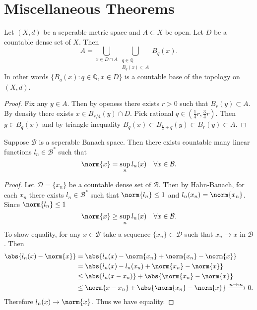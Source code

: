 \documentclass[fontsize=12pt, DIV=10]{scrreprt}
\theoremstyle{remark}
\newcommand{\Q}{\mathbb Q}
\newcommand{\calB}{\mathcal B}
\newcommand{\calD}{\mathcal D}
\begin{document}
\appendix

\chapter{Miscellaneous Theorems}

\begin{prop}
	Let $(X, d)$ be a seperable metric space and $A \subset X$ be open. Let $D$ be a countable dense set of $X$. Then
	\begin{equation}
		A = \bigcup_{x \in D \cap A} \bigcup_{\substack{q \in \Q \\ B_q(x) \subset A}} B_q(x).
	\end{equation}
	In other words $\{B_q(x) : q \in \Q, x \in D\}$ is a countable base of the topology on $(X, d)$.
\end{prop}

\begin{proof}
	Fix any $y \in A$. Then by openess there exists $r > 0$ such that $B_r(y) \subset A$. By density there exists $x \in B_{r/4}(y) \cap D$. Pick rational $q \in \left(\frac{1}{4}r, \frac{3}{4}r \right)$. Then $y \in B_q(x)$ and by triangle inequality $B_q(x) \subset B_{\frac{r}{4} + q}(y) \subset B_r(y) \subset A$.
\end{proof}

\begin{prop}
	Suppose $\calB$ is a seperable Banach space. Then there exists countable many linear functions $l_n \in \calB^*$ such that
	\begin{equation}
		\norm{x} = \sup_n l_n(x) \quad \forall x \in \calB.
	\end{equation}
\end{prop}
\begin{proof}
	Let $\calD = \{x_n\}$ be a countable dense set of $\calB$. Then by Hahn-Banach, for each $x_n$ there exists $l_n \in \calB^*$ such that $\norm{l_n} \leq 1$ and $l_n(x_n) = \norm{x_n}$. Since $\norm{l_n} \leq 1$
	\begin{equation}
		\norm{x} \geq \sup_n l_n(x) \quad \forall x \in \calB.
	\end{equation}
	To show equality, for any $x \in \calB$ take a sequence $\{x_n\} \subset \calD$ such that $x_n \to x$ in $\calB$. Then
	\begin{align}
		\abs{l_n(x) - \norm{x}}
		&= \abs{l_n(x) - \norm{x_n} + \norm{x_n} - \norm{x}} \\
		&= \abs{l_n(x) - l_n(x_n) + \norm{x_n} - \norm{x}} \\
		&\leq \abs{l_n(x - x_n)} + \abs{\norm{x_n} - \norm{x}} \\
		&\leq \norm{x - x_n} + \abs{\norm{x_n}  - \norm{x}} \xrightarrow{n \to \infty} 0.
	\end{align}
	Therefore $l_n(x) \to \norm{x}$. Thus we have equality.
\end{proof}
\end{document}

